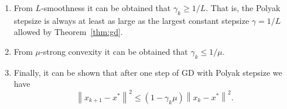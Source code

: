 \documentclass[11pt]{article}
\newcommand{\norm}[1]{\left\| #1 \right\|}
\begin{document}
\begin{enumerate}
  \item[(i)] From $L$-smoothness it can be obtained that $\gamma_k \geq 1/L$. That is,
  the Polyak stepsize is always at least as large as the largest constant stepsize
  $\gamma = 1/L$ allowed by Theorem~\ref{thm:gd}.
  \item[(ii)] From $\mu$-strong convexity it can be obtained that $\gamma_k \leq 1/\mu$.
  \item[(iii)] Finally, it can be shown that after one step of GD with Polyak stepsize we have
  \[
  \norm{x_{k+1}-x^*}^2 \leq (1-\gamma_k\mu)\norm{x_k-x^*}^2.
  \]
\end{enumerate}
\end{document}
